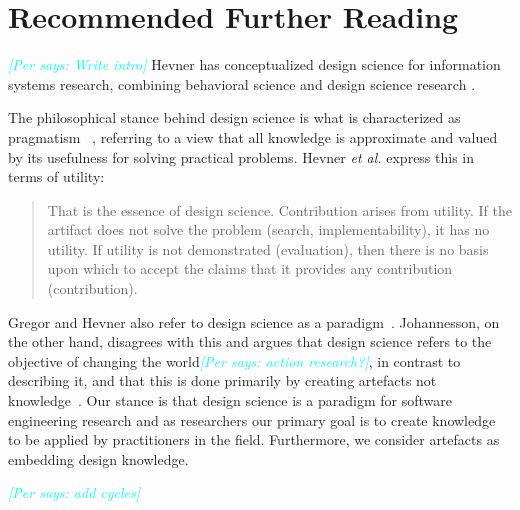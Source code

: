 \documentclass[graybox]{svmult}
\newcommand{\emelie}[1]{\textcolor{red}{{\it [Emelie says: #1]}}}
\newcommand{\per}[1]{\textcolor{cyan}{{\it [Per says: #1]}}}
\newcommand{\emelie}[1]{}
\newcommand{\per}[1]{}
\begin{document}
\section{Recommended Further Reading}
\label{sec:reading}
\per{Write intro}
Hevner has conceptualized design science for information systems research, combining behavioral science and design science research \cite{hevner_design_2004,hevner_design_2010}.

The philosophical stance behind design science is what is characterized as pragmatism~\cite{easterbrook_selecting_2008}%
, referring to a view that all knowledge is approximate and valued by its usefulness for solving practical problems. Hevner \emph{et al.} express this in terms of utility: 

\begin{quote}
	That is the essence of design science. Contribution arises from utility. If the artifact does not solve the problem (search, implementability), it has no utility. If utility is not demonstrated (evaluation), then there is no basis upon which to accept the claims that it provides any contribution (contribution).~\cite[p. 91]{hevner_design_2004}
\end{quote}


Gregor and Hevner also refer to design science as a paradigm~\cite{gregor_positioning_2013}. Johannesson, on the other hand, disagrees with this and argues that design science refers to the objective of changing the world\per{action research?}, in contrast to describing it, and that this is done primarily by creating artefacts not knowledge~\cite{johannesson_introduction_2014}. Our stance is that design science is a paradigm for software engineering research and as researchers our primary goal is to create knowledge to be applied by practitioners in the field. Furthermore, we consider artefacts as embedding design knowledge. 

\per{add cycles}
\end{document}
